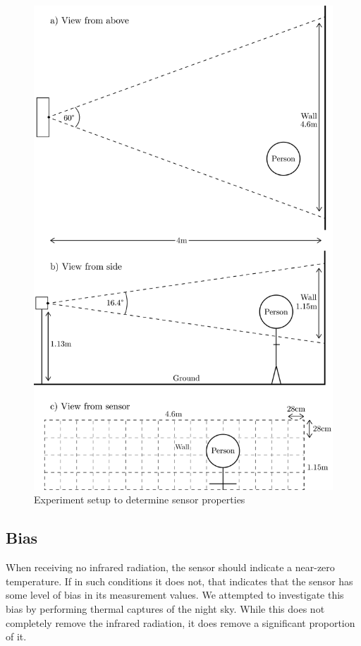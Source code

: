 \documentclass[../thesis/thesis.tex]{subfiles}
\begin{document}
\begin{figure}
\centering
\includegraphics[height=0.9\textheight]{../diagrams/second-exp-setup2.pdf}
\caption{Experiment setup to determine sensor properties}
\label{fig:exps:2setup}
\end{figure}


\subsection{Bias}
When receiving no infrared radiation, the sensor should indicate a near-zero temperature. If in such conditions it does not, that indicates that the sensor has some level of bias in its measurement values. We attempted to investigate this bias by performing thermal captures of the night sky. While this does not completely remove the infrared radiation, it does remove a significant proportion of it.
\end{document}
